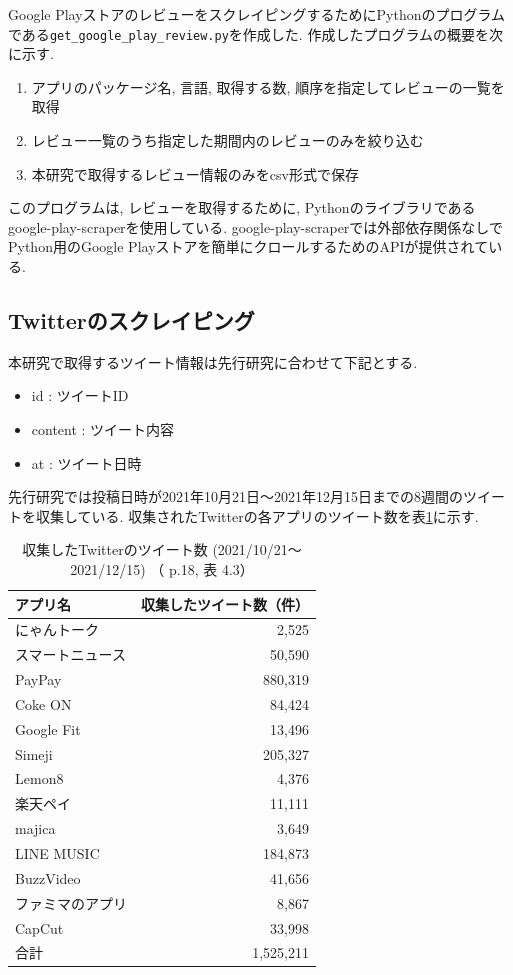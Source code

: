 Google PlayストアのレビューをスクレイピングするためにPythonのプログラムである\verb|get_google_play_review.py|を作成した. 
作成したプログラムの概要を次に示す. 

\begin{enumerate}
  \item アプリのパッケージ名, 言語, 取得する数, 順序を指定してレビューの一覧を取得
  \item レビュー一覧のうち指定した期間内のレビューのみを絞り込む
  \item 本研究で取得するレビュー情報のみをcsv形式で保存
\end{enumerate}
このプログラムは, レビューを取得するために, Pythonのライブラリであるgoogle-play-scraperを使用している. 
google-play-scraperでは外部依存関係なしでPython用のGoogle Playストアを簡単にクロールするためのAPIが提供されている\cite{google-play-scraper}. 


\subsection{Twitterのスクレイピング}
\label{sec:x}
本研究で取得するツイート情報は先行研究\cite{kawatsura}に合わせて下記とする. 
\begin{itemize}
 \item id : ツイートID
 \item content : ツイート内容
 \item at : ツイート日時
\end{itemize}

先行研究では投稿日時が2021年10月21日〜2021年12月15日までの8週間のツイートを収集している. 収集されたTwitterの各アプリのツイート数を表\ref{tb:rawtweetnum}に示す. 

\begin{table}[H]
  \caption{収集したTwitterのツイート数 (2021/10/21〜2021/12/15) （ \cite{kawatsura} p.18, 表 4.3）}
  \label{tb:rawtweetnum}
  \begin{center}
  \begin{tabular}{l|r}
    \hline
    アプリ名&収集したツイート数（件）\\\hline\hline
    にゃんトーク&2,525\\\hline
    スマートニュース&50,590\\\hline
    PayPay&880,319\\\hline
    Coke ON&84,424\\\hline
    Google Fit&13,496\\\hline
    Simeji&205,327\\\hline
    Lemon8&4,376\\\hline
    楽天ペイ&11,111\\\hline
    majica&3,649\\\hline
    LINE MUSIC&184,873\\\hline
    BuzzVideo&41,656\\\hline
    ファミマのアプリ&8,867\\\hline
    CapCut&33,998\\\hline\hline
    合計&1,525,211
  \end{tabular}\end{center}
\end{table}

